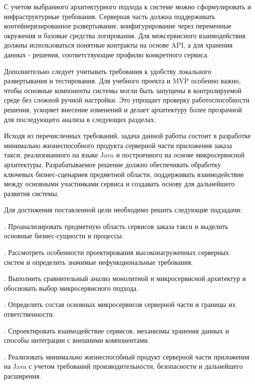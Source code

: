 {\par \redline С учетом выбранного архитектурного подхода к системе можно сформулировать и инфраструктурные требования. Серверная часть должна поддерживать контейнеризированное развертывание, конфигурирование через переменные окружения и базовые средства логирования. Для межсервисного взаимодействия должны использоваться понятные контракты на основе API, а для хранения данных - решения, соответствующие профилю конкретного сервиса.
		
		\par \redline Дополнительно следует учитывать требования к удобству локального развертывания и тестирования. Для учебного проекта и MVP особенно важно, чтобы основные компоненты системы могли быть запущены в контролируемой среде без сложной ручной настройки. Это упрощает проверку работоспособности решения, ускоряет внесение изменений и делает архитектуру более прозрачной для последующего анализа в следующих разделах.
		
		\par \redline Исходя из перечисленных требований, задача данной работы состоит в разработке минимально жизнеспособного продукта серверной части приложения заказа такси, реализованного на языке Java и построенного на основе микросервисной архитектуры. Разрабатываемое решение должно обеспечивать обработку ключевых бизнес-сценариев предметной области, поддерживать взаимодействие между основными участниками сервиса и создавать основу для дальнейшего развития системы.
		
		\par \redline Для достижения поставленной цели необходимо решить следующие подзадачи:
		
		\par {}. Проанализировать предметную область сервисов заказа такси и выделить основные бизнес-сущности и процессы.
		\par {}. Рассмотреть особенности проектирования высоконагруженных серверных систем и определить значимые нефункциональные требования.
		\par {}. Выполнить сравнительный анализ монолитной и микросервисной архитектур и обосновать выбор микросервисного подхода.
		\par {}. Определить состав основных микросервисов серверной части и границы их ответственности.
		\par {}. Спроектировать взаимодействие сервисов, механизмы хранения данных и способы интеграции с внешними компонентами.
		\par {}. Реализовать минимально жизнеспособный продукт серверной части приложения на Java с учетом требований производительности, безопасности и дальнейшего расширения.
		
}

